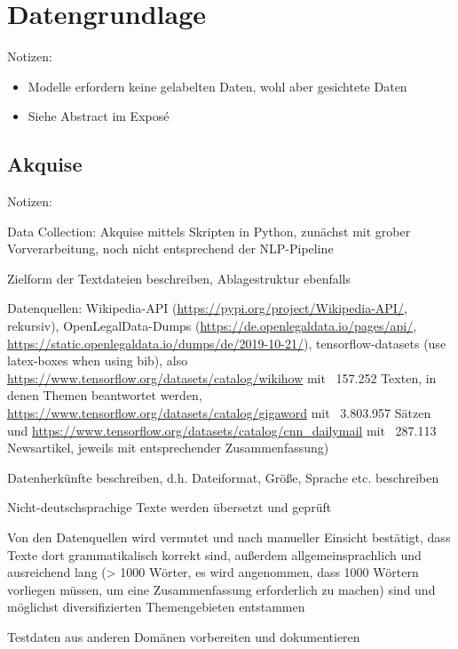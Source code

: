 \chapter{Datengrundlage}
\thispagestyle{fancy}
\label{chap:Datengrundlage}

Notizen:
\begin{itemize}
	\item Modelle erfordern keine gelabelten Daten, wohl aber gesichtete Daten	
	\item Siehe Abstract im Exposé
\end{itemize}


\section{Akquise}
Notizen:
	\item Data Collection: Akquise mittels Skripten in Python, zunächst mit grober Vorverarbeitung, noch nicht entsprechend der NLP-Pipeline
	\item Zielform der Textdateien beschreiben, Ablagestruktur ebenfalls
	\item Datenquellen: Wikipedia-API (\url{https://pypi.org/project/Wikipedia-API/}, rekursiv), OpenLegalData-Dumps (\url{https://de.openlegaldata.io/pages/api/}, \url{https://static.openlegaldata.io/dumps/de/2019-10-21/}), tensorflow-datasets (use latex-boxes when using bib), also \url{https://www.tensorflow.org/datasets/catalog/wikihow} mit ~157.252 Texten, in denen Themen beantwortet werden, \url{https://www.tensorflow.org/datasets/catalog/gigaword} mit ~3.803.957 Sätzen und \url{https://www.tensorflow.org/datasets/catalog/cnn_dailymail} mit ~287.113 Newsartikel, jeweils mit entsprechender Zusammenfassung)
	\item Datenherkünfte beschreiben, d.h. Dateiformat, Größe, Sprache etc. beschreiben
	\item Nicht-deutschsprachige Texte werden übersetzt und geprüft
	\item Von den Datenquellen wird vermutet und nach manueller Einsicht bestätigt, dass Texte dort grammatikalisch korrekt sind, außerdem allgemeinsprachlich und ausreichend lang (> 1000 Wörter, es wird angenommen, dass 1000 Wörtern vorliegen müssen, um eine Zusammenfassung erforderlich zu machen) sind und möglichst diversifizierten Themengebieten entstammen
	\item Testdaten aus anderen Domänen vorbereiten und dokumentieren


